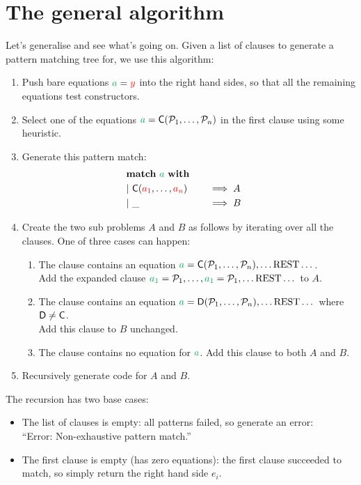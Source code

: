 \documentclass[a4paper, 11pt]{article}
\theoremstyle{definition}
\begin{document}
\section{The general algorithm}

Let's generalise and see what's going on. Given a list of clauses to generate a pattern matching tree for, we use this algorithm:

\begin{enumerate}
  \item Push bare equations $\ba = \fvar y$ into the right hand sides, so that all the remaining equations test constructors.
  \item Select one of the equations $\ba = \C(\pat_1, \dots, \pat_n)$ in the first clause using some heuristic.
  \item Generate this pattern match:
  \begin{alignat*}{4}
    \matchwith{\ba} \\
    \clause{\C(\fvar{a_1}, \dots, \fvar{a_n})}{A} \\
    \clause{\_}{B}
  \end{alignat*}
  \item Create the two sub problems $A$ and $B$ as follows by iterating over all the clauses. One of three cases can happen:
  \begin{enumerate}
    \item The clause contains an equation $\ba = \C(\pat_1, \dots, \pat_n), \dots \text{REST} \dots$. \\
          Add the expanded clause $\bvar{a_1} = \pat_1, \dots, \bvar{a_1} = \pat_1, \dots \text{REST} \dots$ to $A$.
    \item The clause contains an equation $\ba = \mathsf{D}(\pat_1, \dots, \pat_n), \dots \text{REST} \dots$ where $\mathsf{D} \neq \mathsf{\textcolor{black}{C}}$. \\
          Add this clause to $B$ unchanged.
    \item The clause contains no equation for $\ba$. Add this clause to both $A$ and $B$.
  \end{enumerate}
  \item Recursively generate code for $A$ and $B$.
\end{enumerate}

\medskip

\noindent The recursion has two base cases:
\begin{itemize}
  \item The list of clauses is empty: all patterns failed, so generate an error:\\ ``Error: Non-exhaustive pattern match.''
  \item The first clause is empty (has zero equations): the first clause succeeded to match, so simply return the right hand side $e_i$.
\end{itemize}
\end{document}
